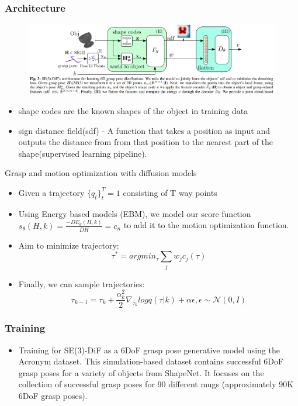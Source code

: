 \documentclass{beamer}
\begin{document}
\begin{frame}\frametitle{Architecture}
\begin{figure}
\includegraphics[width=1\linewidth]{architecture.png}
\end{figure}
\begin{itemize}
    \item shape codes are the known shapes of the object in training data
    \item sign distance field(sdf) - A function that takes a position as input and outputs the distance from from that position to the nearest part of the shape(supervised learning pipeline). 
\end{itemize}
\end{frame}


\begin{frame}{Grasp and motion optimization with diffusion models}
\begin{itemize}
\item Given a trajectory $\{q_t\}^T_t=1$ consisting of T way points
\item Using Energy based models (EBM), we model our score function $s_\theta(H,k)=\frac{-DE_\theta (H,k)}{DH}=c_n$ to add it to the motion optimization function.
\item Aim to minimize trajectory: \[ \tau^* = arg min_\tau \sum_j w_j c_j (\tau)\]
\item Finally, we can sample trajectories: \[\tau_{k-1}=\tau_k+\frac{\alpha^2_k}{2} \nabla_{\tau_k}log q(\tau|k ) + \alpha \epsilon, \epsilon \sim \mathcal{N}(0,I)\]
\end{itemize}
\end{frame}


\begin{frame}\frametitle{Training}
\begin{itemize}
    \item Training for  SE(3)-DiF as a 6DoF grasp
pose generative model using the Acronym dataset. This simulation-based dataset contains successful 6DoF grasp
poses for a variety of objects from ShapeNet. It
focuses on the collection of successful grasp poses for 90
different mugs (approximately 90K 6DoF grasp poses).
\end{itemize}
\end{frame}
\end{document}
